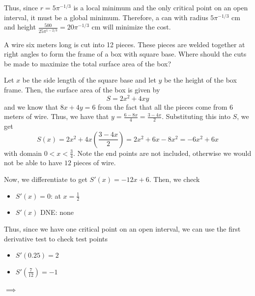 \documentclass[11pt]{exam}
\begin{document}
\begin{questions}
\begin{solution}
    Thus, since \(r = 5 \pi^{-1/3}\) is a local minimum and the only
    critical point on an open interval, it must be a global
    minimum. Therefore, a can with radius \(5 \pi^{-1/3}\) cm and
    height \(\frac{500}{25 \pi^{1-2/3}} = 20 \pi^{-1/3}\) cm will
    minimize the cost.
  \end{solution}
  \vspace{0.4in}
\question  A wire six meters long is cut into 12 pieces. These pieces are welded together at
right angles to form the frame of a box with square base. Where should the cuts
be made to maximize the total surface area of the box?
\begin{solution}
  Let \(x\) be the side length of the square base and let \(y\) be the
  height of the box frame. Then, the surface area of the box is given
  by \[
    S = 2x^2 + 4xy
  \]
  and we know that \(8x+4y = 6\) from the fact that all the pieces
  come from \(6\) meters of wire. Thus, we have that \(y =
  \frac{6-8x}{4} = \frac{3-4x}{2}\). Substituting this into \(S\), we
  get \[
    S(x) = 2x^2 + 4x\left( \frac{3-4x}{2} \right) = 2x^2 + 6x - 8x^2 = -6x^2+6x
  \]
  with domain \(0 < x < \frac{3}{4}\). Note the end points are not
  included, otherwise we would not be able to have \(12\) pieces of
  wire.

  Now, we differentiate to get \(S'(x) = -12x+6\). Then, we check
  \begin{itemize}
  \item \(S'(x) = 0\): at \(x = \frac{1}{2}\)
  \item \(S'(x)\) DNE: none
  \end{itemize}
  Thus, since we have one critical point on an open interval, we can
  use the first derivative test to check test points
  \begin{itemize}
  \item \(S'(0.25) = 2\)
  \item \(S'(\frac{7}{12}) = -1\)
  \end{itemize}
    \(\implies\)


\end{solution}
\end{questions}
\end{document}
